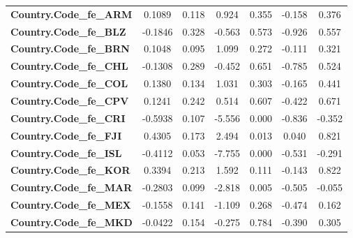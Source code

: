 \begin{center}
\begin{tabular}{lcccccc}
\textbf{Country.Code\_fe\_ARM}                            &       0.1089  &        0.118     &     0.924  &         0.355        &       -0.158    &        0.376     \\
\textbf{Country.Code\_fe\_BLZ}                            &      -0.1846  &        0.328     &    -0.563  &         0.573        &       -0.926    &        0.557     \\
\textbf{Country.Code\_fe\_BRN}                            &       0.1048  &        0.095     &     1.099  &         0.272        &       -0.111    &        0.321     \\
\textbf{Country.Code\_fe\_CHL}                            &      -0.1308  &        0.289     &    -0.452  &         0.651        &       -0.785    &        0.524     \\
\textbf{Country.Code\_fe\_COL}                            &       0.1380  &        0.134     &     1.031  &         0.303        &       -0.165    &        0.441     \\
\textbf{Country.Code\_fe\_CPV}                            &       0.1241  &        0.242     &     0.514  &         0.607        &       -0.422    &        0.671     \\
\textbf{Country.Code\_fe\_CRI}                            &      -0.5938  &        0.107     &    -5.556  &         0.000        &       -0.836    &       -0.352     \\
\textbf{Country.Code\_fe\_FJI}                            &       0.4305  &        0.173     &     2.494  &         0.013        &        0.040    &        0.821     \\
\textbf{Country.Code\_fe\_ISL}                            &      -0.4112  &        0.053     &    -7.755  &         0.000        &       -0.531    &       -0.291     \\
\textbf{Country.Code\_fe\_KOR}                            &       0.3394  &        0.213     &     1.592  &         0.111        &       -0.143    &        0.822     \\
\textbf{Country.Code\_fe\_MAR}                            &      -0.2803  &        0.099     &    -2.818  &         0.005        &       -0.505    &       -0.055     \\
\textbf{Country.Code\_fe\_MEX}                            &      -0.1558  &        0.141     &    -1.109  &         0.268        &       -0.474    &        0.162     \\
\textbf{Country.Code\_fe\_MKD}                            &      -0.0422  &        0.154     &    -0.275  &         0.784        &       -0.390    &        0.305     \\
\bottomrule
\end{tabular}
\end{center}